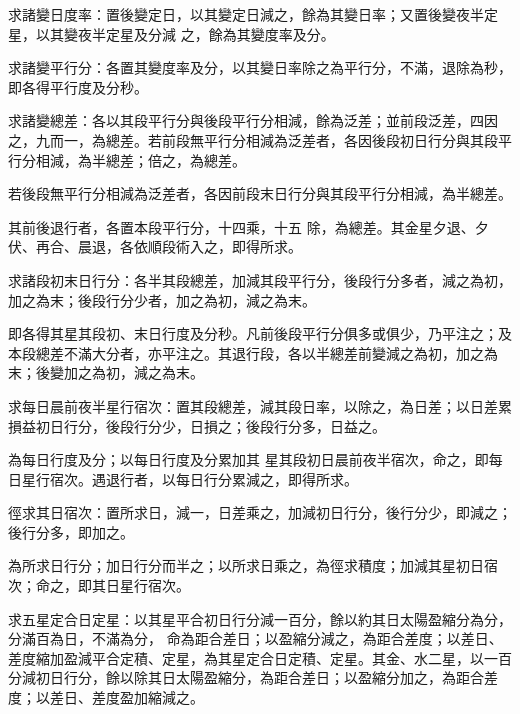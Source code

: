 \begin{pinyinscope}
 求諸變日度率：置後變定日，以其變定日減之，餘為其變日率；又置後變夜半定星，以其變夜半定星及分減
 之，餘為其變度率及分。



 求諸變平行分：各置其變度率及分，以其變日率除之為平行分，不滿，退除為秒，即各得平行度及分秒。



 求諸變總差：各以其段平行分與後段平行分相減，餘為泛差；並前段泛差，四因之，九而一，為總差。若前段無平行分相減為泛差者，各因後段初日行分與其段平行分相減，為半總差；倍之，為總差。



 若後段無平行分相減為泛差者，各因前段末日行分與其段平行分相減，為半總差。



 其前後退行者，各置本段平行分，十四乘，十五
 除，為總差。其金星夕退、夕伏、再合、晨退，各依順段術入之，即得所求。



 求諸段初末日行分：各半其段總差，加減其段平行分，後段行分多者，減之為初，加之為末；後段行分少者，加之為初，減之為末。



 即各得其星其段初、末日行度及分秒。凡前後段平行分俱多或俱少，乃平注之；及本段總差不滿大分者，亦平注之。其退行段，各以半總差前變減之為初，加之為末；後變加之為初，減之為末。



 求每日晨前夜半星行宿次：置其段總差，減其段日率，以除之，為日差；以日差累損益初日行分，後段行分少，日損之；後段行分多，日益之。



 為每日行度及分；以每日行度及分累加其
 星其段初日晨前夜半宿次，命之，即每日星行宿次。遇退行者，以每日行分累減之，即得所求。



 徑求其日宿次：置所求日，減一，日差乘之，加減初日行分，後行分少，即減之；後行分多，即加之。



 為所求日行分；加日行分而半之；以所求日乘之，為徑求積度；加減其星初日宿次；命之，即其日星行宿次。



 求五星定合日定星：以其星平合初日行分減一百分，餘以約其日太陽盈縮分為分，分滿百為日，不滿為分，
 命為距合差日；以盈縮分減之，為距合差度；以差日、差度縮加盈減平合定積、定星，為其星定合日定積、定星。其金、水二星，以一百分減初日行分，餘以除其日太陽盈縮分，為距合差日；以盈縮分加之，為距合差度；以差日、差度盈加縮減之。




\end{pinyinscope}
